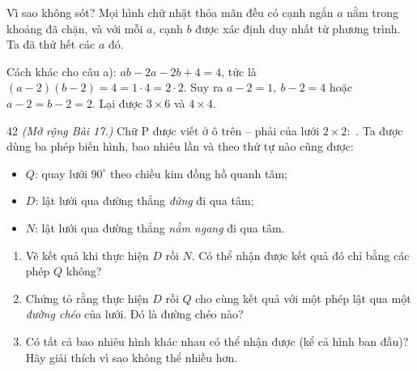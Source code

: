 {\begin{proofbox}Vì sao không sót? Mọi hình chữ nhật thỏa mãn đều có cạnh ngắn $a$ nằm trong khoảng đã chặn,
và với mỗi $a$, cạnh $b$ được xác định duy nhất từ phương trình. Ta đã thử hết các $a$ đó.\end{proofbox}
\begin{tipbox}Cách khác cho câu a): $ab-2a-2b+4=4$, tức là $(a-2)(b-2)=4=1\cdot 4=2\cdot 2$. Suy ra
$a-2=1,\ b-2=4$ hoặc $a-2=b-2=2$. Lại được $3\times 6$ và $4\times 4$.\end{tipbox}
}

\begin{probbox}{42}{}
\textit{(Mở rộng Bài 17.)} Chữ P được viết ở ô trên -- phải của lưới $2\times 2$: \,.
Ta được dùng ba phép biến hình, bao nhiêu lần và theo thứ tự nào cũng được:
\begin{itemize}[leftmargin=1.4em,itemsep=1pt]
\item $Q$: quay lưới $90^\circ$ theo chiều kim đồng hồ quanh tâm;
\item $D$: lật lưới qua đường thẳng \emph{đứng} đi qua tâm;
\item $N$: lật lưới qua đường thẳng \emph{nằm ngang} đi qua tâm.
\end{itemize}
\begin{enumerate}[label=\alph*),leftmargin=1.6em,itemsep=1pt]
\item Vẽ kết quả khi thực hiện $D$ rồi $N$. Có thể nhận được kết quả đó chỉ bằng các phép $Q$ không?
\item Chứng tỏ rằng thực hiện $D$ rồi $Q$ cho cùng kết quả với một phép lật qua một \emph{đường chéo} của lưới.
Đó là đường chéo nào?
\item Có tất cả bao nhiêu hình khác nhau có thể nhận được (kể cả hình ban đầu)? Hãy giải thích vì sao không
thể nhiều hơn.
\end{enumerate}
\end{probbox}
